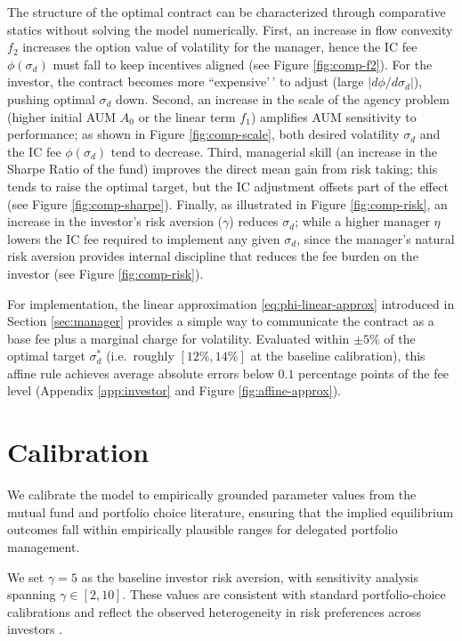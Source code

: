 The structure of the optimal contract can be characterized through
comparative statics without solving the model numerically. First, an
increase in flow convexity \(f_2\) increases the option value of
volatility for the manager, hence the IC fee \(\phi(\sigma_d)\) must
fall to keep incentives aligned (see Figure \ref{fig:comp-f2}). For the
investor, the contract becomes more ``expensive'\,' to adjust (large
\(|d\phi/d\sigma_d|\)), pushing optimal \(\sigma_d\) down. Second, an
increase in the scale of the agency problem (higher initial AUM \(A_0\)
or the linear term \(f_1\)) amplifies AUM sensitivity to performance; as
shown in Figure \ref{fig:comp-scale}, both desired volatility
\(\sigma_d\) and the IC fee \(\phi(\sigma_d)\) tend to decrease. Third,
managerial skill (an increase in the Sharpe Ratio of the fund) improves
the direct mean gain from risk taking; this tends to raise the optimal
target, but the IC adjustment offsets part of the effect (see Figure
\ref{fig:comp-sharpe}). Finally, as illustrated in Figure
\ref{fig:comp-risk}, an increase in the investor's risk aversion
(\(\gamma\)) reduces \(\sigma_d\); while a higher manager \(\eta\)
lowers the IC fee required to implement any given \(\sigma_d\), since
the manager's natural risk aversion provides internal discipline that
reduces the fee burden on the investor (see Figure \ref{fig:comp-risk}).

For implementation, the linear approximation
\eqref{eq:phi-linear-approx} introduced in Section \ref{sec:manager}
provides a simple way to communicate the contract as a base fee plus a
marginal charge for volatility. Evaluated within \(\pm 5\%\) of the
optimal target \(\sigma_d^*\) (i.e.~roughly \([12\%, 14\%]\) at the
baseline calibration), this affine rule achieves average absolute errors
below \(0.1\) percentage points of the fee level (Appendix
\ref{app:investor} and Figure \ref{fig:affine-approx}).

\section{Calibration}\label{sec:calibration}

We calibrate the model to empirically grounded parameter values from the
mutual fund and portfolio choice literature, ensuring that the implied
equilibrium outcomes fall within empirically plausible ranges for
delegated portfolio management.

We set \(\gamma=5\) as the baseline investor risk aversion, with
sensitivity analysis spanning \(\gamma\in[2,10]\). These values are
consistent with standard portfolio-choice calibrations
\citep[][]{campbell2002strategic} and reflect the observed heterogeneity
in risk preferences across investors \citep[][]{guiso2018time}.

